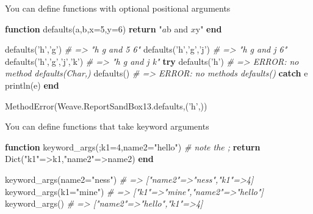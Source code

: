 \documentclass[ignorenonframetext,]{beamer}
\newenvironment{Shaded}{}{}
\newcommand{\KeywordTok}[1]{\textcolor[rgb]{0.00,0.44,0.13}{\textbf{{#1}}}}
\newcommand{\DataTypeTok}[1]{\textcolor[rgb]{0.56,0.13,0.00}{{#1}}}
\newcommand{\FloatTok}[1]{\textcolor[rgb]{0.25,0.63,0.44}{{#1}}}
\newcommand{\CharTok}[1]{\textcolor[rgb]{0.25,0.44,0.63}{{#1}}}
\newcommand{\StringTok}[1]{\textcolor[rgb]{0.25,0.44,0.63}{{#1}}}
\newcommand{\CommentTok}[1]{\textcolor[rgb]{0.38,0.63,0.69}{\textit{{#1}}}}
\newcommand{\NormalTok}[1]{{#1}}
\begin{document}
\begin{frame}[fragile]{You can define functions with optional positional
arguments}

\begin{Shaded}
\begin{Highlighting}[]
\KeywordTok{function} \NormalTok{defaults(a,b,x=}\FloatTok{5}\NormalTok{,y=}\FloatTok{6}\NormalTok{)}
    \KeywordTok{return} \StringTok{"$a $b and $x $y"}
\KeywordTok{end}

\NormalTok{defaults(}\CharTok{'h'}\NormalTok{,}\CharTok{'g'}\NormalTok{) }\CommentTok{# => "h g and 5 6"}
\NormalTok{defaults(}\CharTok{'h'}\NormalTok{,}\CharTok{'g'}\NormalTok{,}\CharTok{'j'}\NormalTok{) }\CommentTok{# => "h g and j 6"}
\NormalTok{defaults(}\CharTok{'h'}\NormalTok{,}\CharTok{'g'}\NormalTok{,}\CharTok{'j'}\NormalTok{,}\CharTok{'k'}\NormalTok{) }\CommentTok{# => "h g and j k"}
\KeywordTok{try}
    \NormalTok{defaults(}\CharTok{'h'}\NormalTok{) }\CommentTok{# => ERROR: no method defaults(Char,)}
    \NormalTok{defaults() }\CommentTok{# => ERROR: no methods defaults()}
\KeywordTok{catch} \NormalTok{e}
    \NormalTok{println(e)}
\KeywordTok{end}
\end{Highlighting}
\end{Shaded}

\begin{Shaded}
\begin{Highlighting}[]
\NormalTok{MethodError(Weave.ReportSandBox13.defaults,(}\CharTok{'h'}\NormalTok{,))}
\end{Highlighting}
\end{Shaded}

\end{frame}

\begin{frame}[fragile]{You can define functions that take keyword
arguments}

\begin{Shaded}
\begin{Highlighting}[]
\KeywordTok{function} \NormalTok{keyword_args(;k1=}\FloatTok{4}\NormalTok{,name2=}\StringTok{"hello"}\NormalTok{) }\CommentTok{# note the ;}
    \KeywordTok{return} \DataTypeTok{Dict}\NormalTok{(}\StringTok{"k1"}\NormalTok{=>k1,}\StringTok{"name2"}\NormalTok{=>name2)}
\KeywordTok{end}

\NormalTok{keyword_args(name2=}\StringTok{"ness"}\NormalTok{) }\CommentTok{# => ["name2"=>"ness","k1"=>4]}
\NormalTok{keyword_args(k1=}\StringTok{"mine"}\NormalTok{) }\CommentTok{# => ["k1"=>"mine","name2"=>"hello"]}
\NormalTok{keyword_args() }\CommentTok{# => ["name2"=>"hello","k1"=>4]}
\end{Highlighting}
\end{Shaded}

\end{frame}
\end{document}
